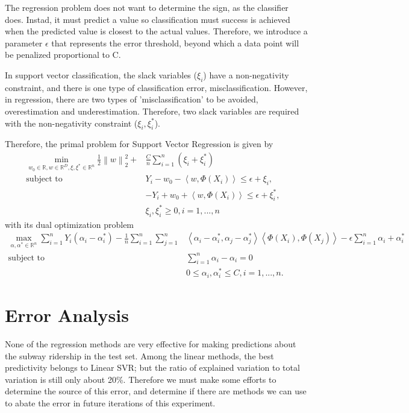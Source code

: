 \documentclass{article}
\begin{document}
The regression problem does not want to determine the sign, as the classifier does. Instad, it must predict a value so classification must success is achieved when the predicted value is closest to the actual values. Therefore, we introduce a parameter $\epsilon$ that represents the error threshold, beyond which a data point will be penalized proportional to C. 

In support vector classification, the slack variables ($\xi_i$) have a non-negativity constraint, and there is one type of classification error, misclassification. However, in regression, there are two types of 'misclassification' to be avoided, overestimation and underestimation. Therefore, two slack variables are required with the non-negativity constraint ($\xi_i, \xi_i^*$).

Therefore, the primal problem for Support Vector Regression is given by 
\begin{align*}
\min_{w_0\in\mathbb{R}, w\in\mathbb{R}^D, \xi,\xi^*\in\mathbb{R}^n}\frac{1}{2}\left\lVert w\right\rVert_2^2 + &\frac{C}{n}\sum_{i=1}^n\left(\xi_i+\xi_i^*\right)& \\ 
\text{subject to }&Y_i-w_0 - \left<w,\Phi(X_i)\right> \leq \epsilon + \xi_i, \\
&-Y_i+w_0 + \left<w,\Phi(X_i)\right> \leq \epsilon + \xi_i^*, \\
&\xi_i, \xi_i^*\geq 0, i = 1, ..., n
\end{align*}
with its dual optimization problem
\begin{align*}
\max_{\alpha, \alpha^*\in\mathbb{R}^n}\sum_{i=1}^nY_i\left(\alpha_i-\alpha^*_i\right) - \frac{1}{n}\sum_{i=1}^n\sum_{j=1}^n&\left<\alpha_i-\alpha_i^*, \alpha_j-\alpha_j^*\right>\left<\Phi(X_i), \Phi(X_j)\right> - \epsilon\sum_{i=1}^n\alpha_i+\alpha^*_i\\
\text{subject to }&\sum_{i=1}^n\alpha_i-\alpha_i=0 \\
&0 \leq \alpha_i, \alpha_i^* \leq C, i=1, ... , n.
\end{align*}

\section{Error Analysis}

None of the regression methods are very effective for making predictions about the subway ridership in the test set. Among the linear methods, the best predictivity belongs to Linear SVR; but the ratio of explained variation to total variation is still only about 20\%. Therefore we must make some efforts to determine the source of this error, and determine if there are methods we can use to abate the error in future iterations of this experiment. 
\end{document}
